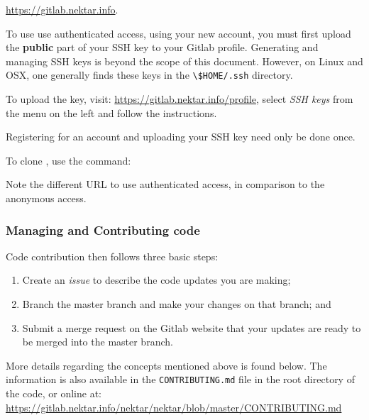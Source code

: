\url{https://gitlab.nektar.info}.

To use use authenticated access, using your new account, you must first upload the \textbf{public} part of your SSH key to your Gitlab profile. Generating and managing SSH keys is beyond the scope of this document. However, on Linux and OSX, one generally finds these keys in the \lstinline{\$HOME/.ssh} directory.

To upload the key, visit: \url{https://gitlab.nektar.info/profile}, select \emph{SSH keys} from the menu on the left and follow the instructions.

Registering for an account and uploading your SSH key need only be done once.

To clone {\nek}, use the {\GIT} command:


Note the different URL to use authenticated access, in comparison to the anonymous access.


\subsubsection{Managing and Contributing code}
Code contribution then follows three basic steps:
\begin{enumerate}
    \item Create an \emph{issue} to describe the code updates you are making;
    \item Branch the {\nek} master branch and make your changes on that branch; and 
    \item Submit a merge request on the {\nek} Gitlab website that your updates are ready to be merged into the master branch.
\end{enumerate}

More details regarding the concepts mentioned above is found below. The information is also available in the \texttt{CONTRIBUTING.md} file in the root directory of the code, or online at:
\url{https://gitlab.nektar.info/nektar/nektar/blob/master/CONTRIBUTING.md}

